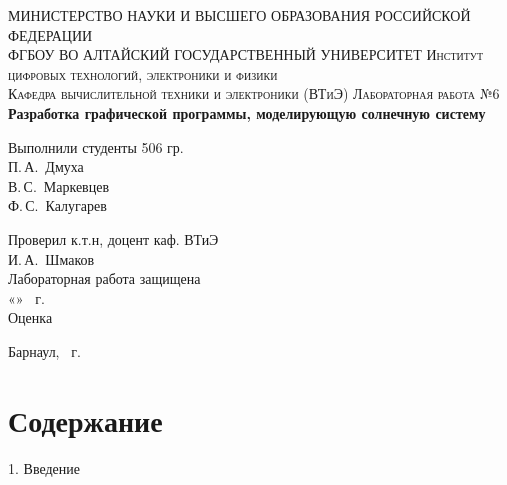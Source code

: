 \documentclass[12pt,a4paper]{extarticle}
\begin{document}
\begin{titlepage}
\begin{center}
\MakeUppercase{Министерство науки и высшего образования Российской Федерации} \\
\MakeUppercase{ФГБОУ ВО АЛТАЙСКИЙ ГОСУДАРСТВЕННЫЙ УНИВЕРСИТЕТ}
\vfill
\textsc{Институт цифровых технологий, электроники и физики} \\

\textsc{Кафедра вычислительной техники и электроники (ВТиЭ)}
\vfill
\textsc{Лабораторная работа №6} \\
\textbf{Разработка графической программы, моделирующую солнечную систему}
\bigskip

\end{center}
\vfill

\newlength{\ML}
\hfill\begin{minipage}{0.5\textwidth}
Выполнили студенты 506 гр.\\
\underline{\hspace{4cm}} П.\,А.~Дмуха\\
\underline{\hspace{4cm}} В.\,С.~Маркевцев\\
\underline{\hspace{4cm}} Ф.\,С.~Калугарев\\
\end{minipage}%

\hfill\begin{minipage}{0.5\textwidth}
Проверил к.т.н, доцент каф. ВТиЭ\\
\underline{\hspace{4cm}} И.\,А.~Шмаков\\
Лабораторная работа защищена\\
«\underline{\hspace{0.7cm}}» \underline{\hspace{4cm}} \the\year~г. \\
Оценка \underline{\hspace{3.6cm}}
\end{minipage}%
\vfill

\begin{center}
Барнаул, \the\year~г.
\end{center}
\end{titlepage}
\section*{Содержание}
1. Введение
\end{document}
